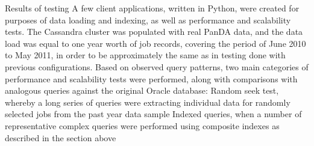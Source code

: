 Results of testing
A few client applications, written in Python, were created for purposes of data loading and indexing, as well as performance and scalability tests. The Cassandra cluster was populated with real PanDA data, and the data load was equal to one year worth of job records, covering the period of June 2010 to May 2011, in order to be approximately the same as in testing done with previous configurations. Based on observed query patterns, two main categories of performance and scalability tests were performed, along with comparisons with analogous queries against the original Oracle database:
Random seek test, whereby a long series of queries were extracting individual data for randomly selected jobs from the past year data sample
Indexed queries, when a number of representative complex queries were performed using composite indexes as described in the section above

